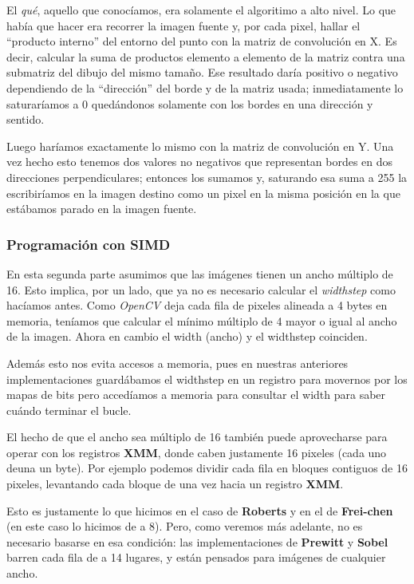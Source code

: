El \emph{qué}, aquello que conocíamos, era solamente el algoritimo a alto nivel.
Lo que había que hacer era recorrer la imagen fuente y, por cada pixel, hallar el
``producto interno'' del entorno del punto con la matriz de convolución en X. Es
decir, calcular la suma de productos elemento a elemento de la matriz contra una
submatriz del dibujo del mismo tamaño. Ese resultado daría positivo o negativo
dependiendo de la ``dirección'' del borde y de la matriz usada; inmediatamente
lo saturaríamos a 0 quedándonos solamente con los bordes en una dirección y
sentido.

Luego haríamos exactamente lo mismo con la matriz de convolución en Y. Una vez
hecho esto tenemos dos valores no negativos que representan bordes en dos direcciones
perpendiculares; entonces los sumamos y, saturando esa suma a 255 la escribiríamos 
en la imagen destino como un pixel en la misma posición en la que estábamos parado
en la imagen fuente.


\subsubsection{Programación con SIMD}

En esta segunda parte asumimos que las imágenes tienen un ancho múltiplo de 16.
Esto implica, por un lado, que ya no es necesario calcular el \emph{widthstep}
como hacíamos antes. Como \emph{OpenCV} deja cada fila de pixeles alineada a 4
bytes en memoria, teníamos que calcular el mínimo múltiplo de 4 mayor o igual al
ancho de la imagen. Ahora en cambio el width (ancho) y el widthstep coinciden.

Además esto nos evita accesos a memoria, pues en nuestras anteriores implementaciones
	guardábamos el widthstep en un registro para movernos por los mapas de bits pero
accedíamos a memoria para consultar el width para saber cuándo terminar el bucle.

El hecho de que el ancho sea múltiplo de 16 también puede aprovecharse para operar
con los registros \textbf{XMM}, donde caben justamente 16 pixeles (cada uno deuna  un byte).
Por ejemplo podemos dividir cada fila en bloques contiguos de 16 pixeles, levantando
cada bloque de una vez hacia un registro \textbf{XMM}.

Esto es justamente lo que hicimos en el caso de \textbf{Roberts} y en el de
\textbf{Frei-chen} (en este caso lo hicimos de a 8). Pero, como veremos más adelante,
no es necesario basarse en esa condición: las implementaciones de \textbf{Prewitt} y
\textbf{Sobel} barren cada fila de a 14 lugares, y están pensados para imágenes 
de cualquier ancho.

